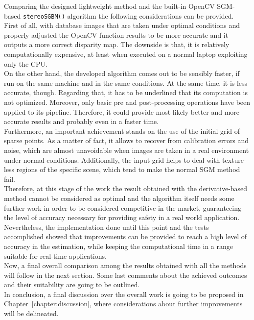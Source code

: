 Comparing the designed lightweight method and the built-in OpenCV SGM-based \texttt{stereoSGBM()} algorithm the following considerations can be provided.\\
First of all, with database images that are taken under optimal conditions and properly adjusted the OpenCV function results to be more accurate and it outputs a more correct disparity map.
The downside is that, it is relatively computationally expensive, at least when executed on a normal laptop exploiting only the CPU.\\
On the other hand, the developed algorithm comes out to be sensibly faster, if run on the same machine and in the same conditions. 
At the same time, it is less accurate, though. 
Regarding that, it has to be underlined that its computation is not optimized.
Moreover, only basic pre and post-processing operations have been applied to its pipeline.
Therefore, it could provide most likely better and more accurate results and probably even in a faster time. \\
Furthermore, an important achievement stands on the use of the initial grid of sparse points.
As a matter of fact, it allows to recover from calibration errors and noise, which are almost unavoidable when images are taken in a real environment under normal conditions.  
Additionally, the input grid helps to deal with texture-less regions of the specific scene, which tend to make the normal SGM method fail. \\
Therefore, at this stage of the work the result obtained with the derivative-based method cannot be considered as optimal and the algorithm itself needs some further work in order to be considered competitive in the market, guaranteeing the level of accuracy necessary for providing safety in a real world application.
Nevertheless, the implementation done until this point and the tests accomplished showed that improvements can be provided to reach a high level of accuracy in the estimation, while keeping the computational time in a range suitable for real-time applications. \\
Now, a final overall comparison among the results obtained with all the methods will follow in the next section. 
Some last comments about the achieved outcomes and their suitability are going to be outlined. \\
In conclusion, a final discussion over the overall work is going to be proposed in Chapter~\ref{chapter:discussion}, where considerations about further improvements will be delineated. 
 
